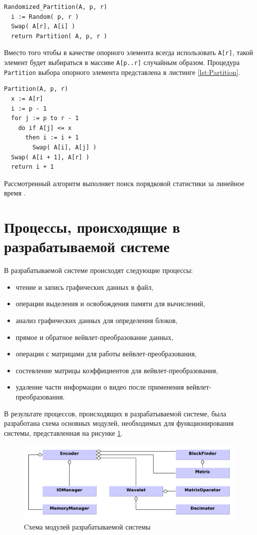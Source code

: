 \begin{lstlisting}[style=pseudocode,caption={Код процедуры Randomized\_Partition},label=lst:RandomizedPartition]
Randomized_Partition(A, p, r)
  i := Random( p, r )
  Swap( A[r], A[i] )
  return Partition( A, p, r )
\end{lstlisting}

Вместо того чтобы в качестве опорного элемента всегда использовать \texttt{А[r]}, 
такой элемент будет выбираться в массиве \texttt{A[p..r]} случайным образом. 
Процедура \texttt{Partition} выбора опорного элемента представлена в листинге \ref{lst:Partition}.

\begin{lstlisting}[style=pseudocode,caption={Код процедуры Partition},label=lst:Partition]
Partition(A, p, r)
  x := A[r] 
  i := p - 1
  for j := p to r - 1
    do if A[j] <= x
      then i := i + 1
        Swap( A[i], A[j] )
  Swap( A[i + 1], A[r] )      
  return i + 1
\end{lstlisting}

Рассмотренный алгоритм выполняет поиск порядковой статистики за линейное время \cite{Pup05}.

\section{Процессы, происходящие в разрабатываемой системе}
В разрабатываемой системе происходят следующие процессы:
\begin{itemize}
 \item чтение и запись графических данных в файл,
 \item операции выделения и освобождения памяти для вычислений,
 \item анализ графических данных для определения блоков,
 \item прямое и обратное вейвлет-преобразование данных,
 \item операции с матрицами для работы вейвлет-преобразования,
 \item состевление матрицы коэффициентов для вейвлет-преобразования,
 \item удаление части информации о видео после применения вейвлет-преобразования. 
\end{itemize}

В результате процессов, происходящих в разрабатываемой системе, 
была разработана схема основных модулей, необходимых для функционирования системы,       
представленная на рисунке \ref{fig:modules}. 

\begin{figure}
  \centering
  \includegraphics[scale=0.6]{inc/graphics/modules.pdf}
  \caption{Cхема модулей разрабатываемой системы}
  \label{fig:modules}
\end{figure}

